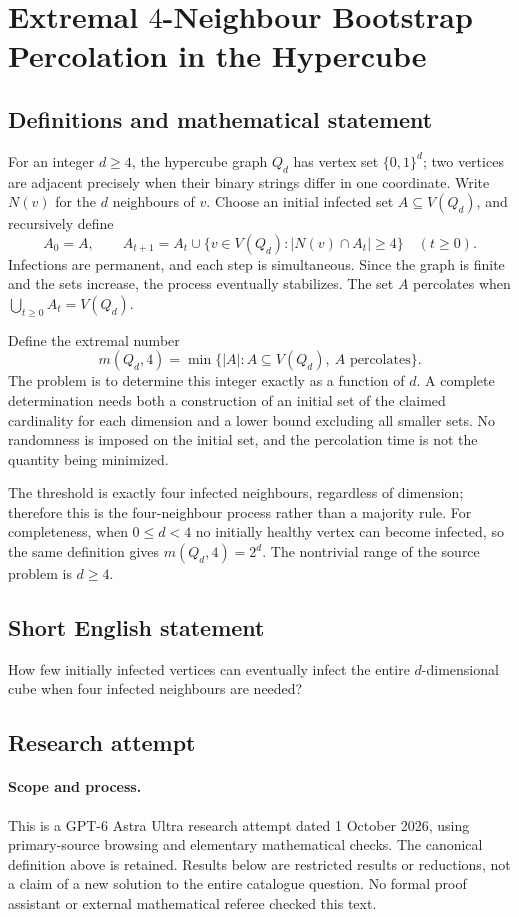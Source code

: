 \documentclass[11pt,a4paper]{article}
\begin{document}
\section*{Extremal $4$-Neighbour Bootstrap Percolation in the Hypercube}\label{statement}

\subsection{Definitions and mathematical statement}
For an integer $d\ge4$, the hypercube graph $Q_d$ has vertex set
$\{0,1\}^d$; two vertices are adjacent precisely when their binary strings
differ in one coordinate. Write $N(v)$ for the $d$ neighbours of $v$.
Choose an initial infected set $A\subseteq V(Q_d)$, and recursively define
\[
 A_0=A,\qquad
 A_{t+1}=A_t\cup\{v\in V(Q_d):|N(v)\cap A_t|\ge4\}
 \quad(t\ge0).
\]
Infections are permanent, and each step is simultaneous. Since the graph
is finite and the sets increase, the process eventually stabilizes.
The set $A$ percolates when $\bigcup_{t\ge0}A_t=V(Q_d)$.

Define the extremal number
\[
 m(Q_d,4)=\min\{|A|:A\subseteq V(Q_d),\ A\text{ percolates}\}.
\]
The problem is to determine this integer exactly as a function of $d$.
A complete determination needs both a construction of an initial set of
the claimed cardinality for each dimension and a lower bound excluding
all smaller sets. No randomness is imposed on the initial set, and the
percolation time is not the quantity being minimized.

The threshold is exactly four infected neighbours, regardless of dimension;
therefore this is the four-neighbour process rather than a majority rule.
For completeness, when $0\le d<4$ no initially healthy vertex can become
infected, so the same definition gives $m(Q_d,4)=2^d$. The nontrivial range
of the source problem is $d\ge4$.
\subsection{Short English statement}
How few initially infected vertices can eventually infect the entire $d$-dimensional cube when four infected neighbours are needed?
\subsection{Research attempt}
\paragraph{Scope and process.}
This is a GPT-6 Astra Ultra research attempt dated 1 October 2026, using
primary-source browsing and elementary mathematical checks. The canonical
definition above is retained. Results below are restricted results or
reductions, not a claim of a new solution to the entire catalogue question.
No formal proof assistant or external mathematical referee checked this text.
\end{document}
